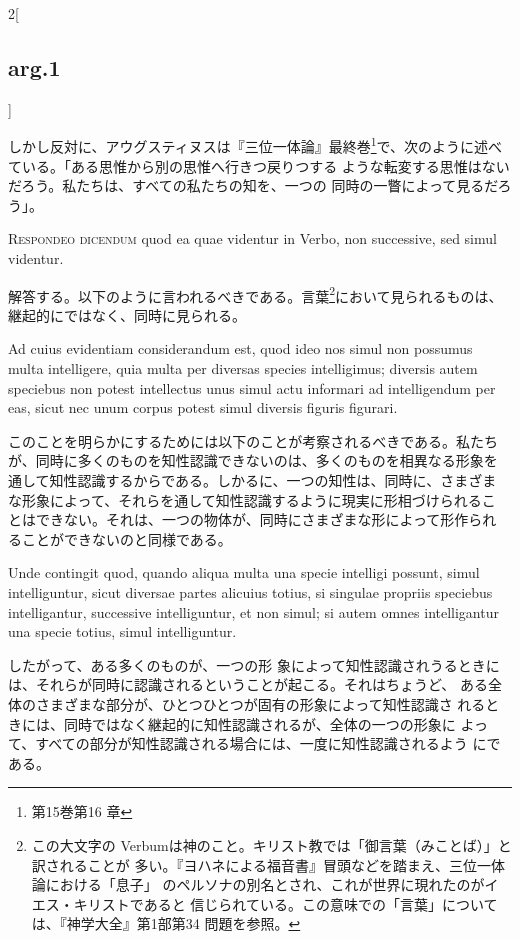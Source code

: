 \documentclass[paper=a4paper,fontsize=10pt,jafontsize=9pt,titlepage]{jlreq}
\begin{document}
\begin{paracol}{2}[\subsection{arg.1}]
\switchcolumn

しかし反対に、アウグスティヌスは『三位一体論』最終巻\footnote{第15巻第16
章}で、次のように述べている。「ある思惟から別の思惟へ行きつ戻りつする
ような転変する思惟はないだろう。私たちは、すべての私たちの知を、一つの
同時の一瞥によって見るだろう」。


{\scshape Respondeo dicendum} quod ea quae videntur in Verbo, non
successive, sed simul videntur.

\switchcolumn

解答する。以下のように言われるべきである。言葉\footnote{この大文字の
Verbumは神のこと。キリスト教では「御言葉（みことば）」と訳されることが
多い。『ヨハネによる福音書』冒頭などを踏まえ、三位一体論における「息子」
のペルソナの別名とされ、これが世界に現れたのがイエス・キリストであると
信じられている。この意味での「言葉」については、『神学大全』第1部第34
問題を参照。}において見られるものは、継起的にではなく、同時に見られる。

\switchcolumn*

Ad cuius evidentiam considerandum est,
quod ideo nos simul non possumus multa intelligere, quia multa per
diversas species intelligimus; diversis autem speciebus non potest
intellectus unus simul actu informari ad intelligendum per eas, sicut
nec unum corpus potest simul diversis figuris figurari.

\switchcolumn

このことを明らかにするためには以下のことが考察されるべきである。私たち
が、同時に多くのものを知性認識できないのは、多くのものを相異なる形象を
通して知性認識するからである。しかるに、一つの知性は、同時に、さまざま
な形象によって、それらを通して知性認識するように現実に形相づけられるこ
とはできない。それは、一つの物体が、同時にさまざまな形によって形作られ
ることができないのと同様である。

\switchcolumn*

Unde contingit
quod, quando aliqua multa una specie intelligi possunt, simul
intelliguntur, sicut diversae partes alicuius totius, si singulae
propriis speciebus intelligantur, successive intelliguntur, et non
simul; si autem omnes intelligantur una specie totius, simul
intelliguntur.

\switchcolumn

したがって、ある多くのものが、一つの形
象によって知性認識されうるときには、それらが同時に認識されるということが起こる。それはちょうど、
ある全体のさまざまな部分が、ひとつひとつが固有の形象によって知性認識さ
れるときには、同時ではなく継起的に知性認識されるが、全体の一つの形象に
よって、すべての部分が知性認識される場合には、一度に知性認識されるよう
にである。


\end{paracol}
\end{document}
